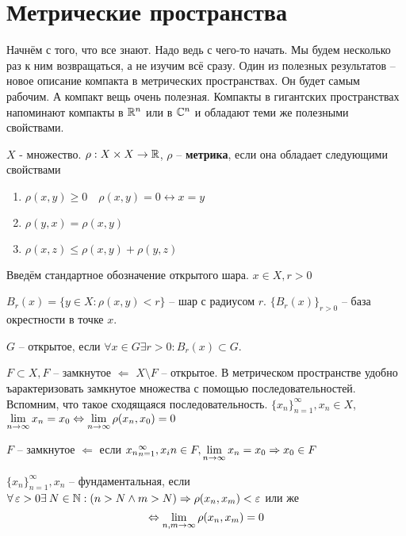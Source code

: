 \documentclass[document]{subfiles}
\begin{document}
\chapter{Метрические пространства}
Начнём с того, что все знают. Надо ведь с чего-то начать. Мы будем несколько раз к ним возвращаться, а не изучим всё сразу. Один из полезных результатов -- новое описание компакта в метрических пространствах. Он будет
самым рабочим. А компакт вещь очень полезная. Компакты в гигантских пространствах напоминают компакты в $\mathbb{R}^n$ или в $\mathbb{C}^n$ и обладают теми же полезными свойствами.

\begin{definition}[Метрика]
    $X$ - множество. $\rho: X \times X \rightarrow \mathbb{R}$, $\rho$ -- \textbf{метрика}, если она обладает следующими свойствами
    \begin{enumerate}
        \item $\rho(x,y) \geq 0 \quad \rho(x,y) = 0 \leftrightarrow x = y$
        \item $\rho(y,x) = \rho(x,y)$
        \item $\rho(x,z) \leq \rho(x,y) + \rho(y,z)$
    \end{enumerate}
\end{definition}

Введём стандартное обозначение открытого шара. $x \in X, r > 0$

$B_r(x) = \{y \in X: \rho(x,y) < r \}$ -- шар с радиусом $r$.
$ \{B_r(x) \}_{r > 0}$ -- база окрестности в точке $x$.

$G$ -- открытое, если $\forall x \in G \exists r > 0 : B_r(x) \subset G$.

$F \subset X, F$ -- замкнутое $\Leftarrow$ $X \setminus F$ -- открытое.
В метрическом пространстве удобно ъарактеризовать замкнутое множества с помощью последовательностей. Вспомним, что такое сходящаяся последовательность.
$\{x_n\}_{n=1}^\infty, x_n \in X$, $\lim\limits_{n \to \infty} x_n = x_0 \Leftrightarrow \lim\limits_{n \to \infty} \rho(x_n, x_0) = 0$

$F$ -- замкнутое $\Leftarrow$ если ${x_n}_{n=1}^\infty, x_in \in F, \lim\limits_{n \to \infty } x_n = x_0 \Rightarrow x_0 \in F$


\begin{definition}
    $\{x_n\}^\infty_{n=1}, x_n$ -- фундаментальная, если $\forall \varepsilon > 0 \exists N \in \bN : (n > N \wedge m > N) \Rightarrow \rho(x_n, x_m) < \varepsilon$
    или же 
    \[ \Leftrightarrow \lim\limits_{n,m \to \infty} \rho(x_n,x_m) = 0 \]
\end{definition}
\end{document}
